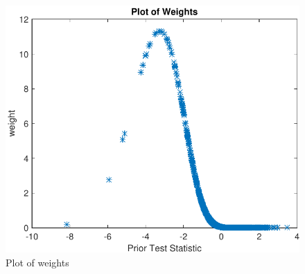 \documentclass[english,11pt]{article} %
\begin{document}
\begin{figure}[ht!]
\centering
\includegraphics[scale=0.6]{"../Data/weights"}
\caption{Plot of weights}
\label{scatter_prior_current}
\end{figure}





\end{document}
